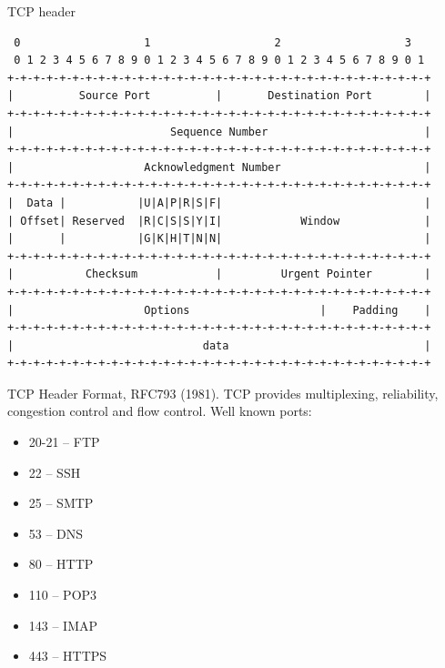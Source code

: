 \begin{parag}{TCP header}
    \begin{verbatim}
 0                   1                   2                   3
 0 1 2 3 4 5 6 7 8 9 0 1 2 3 4 5 6 7 8 9 0 1 2 3 4 5 6 7 8 9 0 1
+-+-+-+-+-+-+-+-+-+-+-+-+-+-+-+-+-+-+-+-+-+-+-+-+-+-+-+-+-+-+-+-+
|          Source Port          |       Destination Port        |
+-+-+-+-+-+-+-+-+-+-+-+-+-+-+-+-+-+-+-+-+-+-+-+-+-+-+-+-+-+-+-+-+
|                        Sequence Number                        |
+-+-+-+-+-+-+-+-+-+-+-+-+-+-+-+-+-+-+-+-+-+-+-+-+-+-+-+-+-+-+-+-+
|                    Acknowledgment Number                      |
+-+-+-+-+-+-+-+-+-+-+-+-+-+-+-+-+-+-+-+-+-+-+-+-+-+-+-+-+-+-+-+-+
|  Data |           |U|A|P|R|S|F|                               |
| Offset| Reserved  |R|C|S|S|Y|I|            Window             |
|       |           |G|K|H|T|N|N|                               |
+-+-+-+-+-+-+-+-+-+-+-+-+-+-+-+-+-+-+-+-+-+-+-+-+-+-+-+-+-+-+-+-+
|           Checksum            |         Urgent Pointer        |
+-+-+-+-+-+-+-+-+-+-+-+-+-+-+-+-+-+-+-+-+-+-+-+-+-+-+-+-+-+-+-+-+
|                    Options                    |    Padding    |
+-+-+-+-+-+-+-+-+-+-+-+-+-+-+-+-+-+-+-+-+-+-+-+-+-+-+-+-+-+-+-+-+
|                             data                              |
+-+-+-+-+-+-+-+-+-+-+-+-+-+-+-+-+-+-+-+-+-+-+-+-+-+-+-+-+-+-+-+-+
    \end{verbatim}
	TCP Header Format, RFC793 (1981). TCP provides multiplexing, reliability, congestion control and flow control. Well known ports:
	\begin{itemize}
	    \item 20-21 -- FTP
	    \item 22 -- SSH
	    \item 25 -- SMTP
	    \item 53 -- DNS
	    \item 80 -- HTTP
	    \item 110 -- POP3
	    \item 143 -- IMAP
	    \item 443 -- HTTPS
	\end{itemize}
\end{parag}

